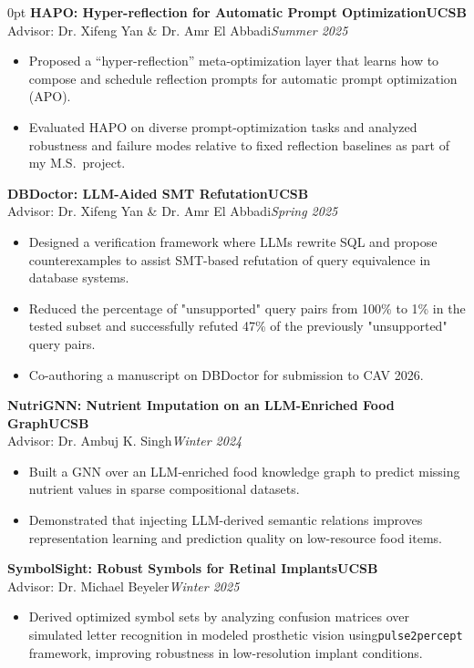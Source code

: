 \documentclass[11pt]{article}
\newlength{\sectionwidth}
\newcommand{\CVSection}[2]{%
  \vspace{1.4em} 
  \noindent
  \makebox[0pt][l]{%
    \parbox[t]{\sectionwidth}{%
      \raggedright\scshape\bfseries\small #1%
    }%
  }%
  \begin{adjustwidth}{\sectionwidth}{0pt}
    #2
  \end{adjustwidth}
}
\newcommand{\CVEntry}[4]{%
  \vspace{0.4em} %
  {\bfseries #1}\hfill {\bfseries #2}\\[0.1em] 
  #3\hfill \textit{#4}
}
\begin{document}
\CVSection{Research\\Experience}{%
\CVEntry
{HAPO: Hyper-reflection for Automatic Prompt Optimization}
    {UCSB}
    {Advisor: Dr. Xifeng Yan \& Dr. Amr El Abbadi}
    {Summer 2025}
  \begin{itemize}
    \item Proposed a ``hyper-reflection'' meta-optimization layer that learns how to compose and schedule reflection prompts for automatic prompt optimization (APO).
    \item Evaluated HAPO on diverse prompt-optimization tasks and analyzed robustness and failure modes relative to fixed reflection baselines as part of my M.S.\ project.
  \end{itemize}
\CVEntry
{DBDoctor: LLM-Aided SMT Refutation}
    {UCSB}
    {Advisor: Dr. Xifeng Yan \& Dr. Amr El Abbadi}
    {Spring 2025}
  \begin{itemize}
    \item Designed a verification framework where LLMs rewrite SQL and propose counterexamples to assist SMT-based refutation of query equivalence in database systems.
    \item Reduced the percentage of "unsupported" query pairs from 100\% to 1\% in the tested subset and successfully refuted 47\% of the previously "unsupported" query pairs.
    \item Co-authoring a manuscript on DBDoctor for submission to CAV 2026.
  \end{itemize}
    \CVEntry
    {NutriGNN: Nutrient Imputation on an LLM-Enriched Food Graph}
    {UCSB}
    {Advisor: Dr. Ambuj K. Singh}
    {Winter 2024}
  \begin{itemize}
    \item Built a GNN over an LLM-enriched food knowledge graph to predict missing nutrient values in sparse compositional datasets.
    \item Demonstrated that injecting LLM-derived semantic relations improves representation learning and prediction quality on low-resource food items.
  \end{itemize}
  \vspace{0.4em}
  \CVEntry
    {SymbolSight: Robust Symbols for Retinal Implants}
    {UCSB}
    {Advisor: Dr. Michael Beyeler}
    {Winter 2025}
  \begin{itemize}
    \item Derived optimized symbol sets by analyzing confusion matrices over simulated letter recognition in modeled prosthetic vision using\texttt{pulse2percept} framework, improving robustness in low-resolution implant conditions.

\end{itemize}}
\end{document}
